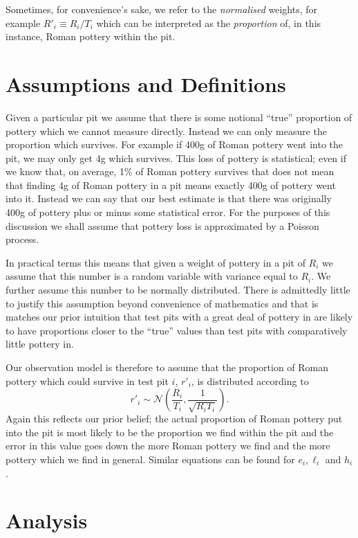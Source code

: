 \documentclass[a4paper]{paper}
\begin{document}
Sometimes, for convenience's sake, we refer to the \emph{normalised} weights,
for example $R'_i \equiv R_i / T_i$ which can be interpreted as the
\emph{proportion} of, in this instance, Roman pottery within the pit.

\section{Assumptions and Definitions}

Given a particular pit we assume that there is some notional ``true'' proportion
of pottery which we cannot measure directly. Instead we can only measure the
proportion which survives. For example if 400g of Roman pottery went into the
pit, we may only get 4g which survives. This loss of pottery is statistical;
even if we know that, on average, 1\% of Roman pottery survives that does not
mean that finding 4g of Roman pottery in a pit means exactly 400g of pottery
went into it. Instead we can say that our best estimate is that there was
originally 400g of pottery plus or minus some statistical error. For the
purposes of this discussion we shall assume that pottery loss is approximated by
a Poisson process.

In practical terms this means that given a weight of pottery in a pit of $R_i$
we assume that this number is a random variable with variance equal to $R_i$. We
further assume this number to be normally distributed. There is admittedly
little to justify this assumption beyond convenience of mathematics and that is
matches our prior intuition that test pits with a great deal of pottery in are
likely to have proportions closer to the ``true'' values than test pits with
comparatively little pottery in.

Our observation model is therefore to assume that the proportion of Roman
pottery which could survive in test pit $i$, $r'_i$, is distributed according to
\[
    r'_i \sim \mathcal{N}\left(\frac{R_i}{T_i}, \frac{1}{\sqrt{R_i T_i}} \right).
\]
Again this reflects our prior belief; the actual proportion of Roman pottery put
into the pit is most likely to be the proportion we find within the pit and the
error in this value goes down the more Roman pottery we find and the more
pottery which we find in general. Similar equations can be found for $e_i,
\ell_i$ and $h_i$.

\section{Analysis}
\end{document}
